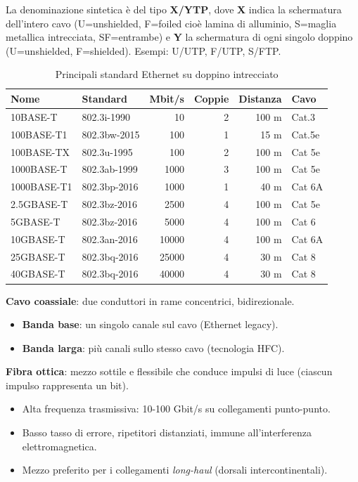 \documentclass[12pt, a4paper]{article}
\begin{document}
La denominazione sintetica è del tipo \textbf{X/YTP}, dove \textbf{X} indica la schermatura dell'intero cavo (U=unshielded, F=foiled cioè lamina di alluminio, S=maglia metallica intrecciata, SF=entrambe) e \textbf{Y} la schermatura di ogni singolo doppino (U=unshielded, F=shielded). Esempi: U/UTP, F/UTP, S/FTP.

\begin{table}[H]
\centering
\caption{Principali standard Ethernet su doppino intrecciato}
\begin{tabular}{llrrrl}
\toprule
\textbf{Nome} & \textbf{Standard} & \textbf{Mbit/s} & \textbf{Coppie} & \textbf{Distanza} & \textbf{Cavo} \\
\midrule
10BASE-T & 802.3i-1990 & 10 & 2 & 100 m & Cat.3 \\
100BASE-T1 & 802.3bw-2015 & 100 & 1 & 15 m & Cat.5e \\
100BASE-TX & 802.3u-1995 & 100 & 2 & 100 m & Cat 5e \\
1000BASE-T & 802.3ab-1999 & 1000 & 3 & 100 m & Cat 5e \\
1000BASE-T1 & 802.3bp-2016 & 1000 & 1 & 40 m & Cat 6A \\
2.5GBASE-T & 802.3bz-2016 & 2500 & 4 & 100 m & Cat 5e \\
5GBASE-T & 802.3bz-2016 & 5000 & 4 & 100 m & Cat 6 \\
10GBASE-T & 802.3an-2016 & 10000 & 4 & 100 m & Cat 6A \\
25GBASE-T & 802.3bq-2016 & 25000 & 4 & 30 m & Cat 8 \\
40GBASE-T & 802.3bq-2016 & 40000 & 4 & 30 m & Cat 8 \\
\bottomrule
\end{tabular}
\end{table}

\textbf{Cavo coassiale}: due conduttori in rame concentrici, bidirezionale.
\begin{itemize}
    \item \textbf{Banda base}: un singolo canale sul cavo (Ethernet legacy).
    \item \textbf{Banda larga}: più canali sullo stesso cavo (tecnologia HFC).
\end{itemize}

\textbf{Fibra ottica}: mezzo sottile e flessibile che conduce impulsi di luce (ciascun impulso rappresenta un bit).
\begin{itemize}
    \item Alta frequenza trasmissiva: 10-100 Gbit/s su collegamenti punto-punto.
    \item Basso tasso di errore, ripetitori distanziati, immune all'interferenza elettromagnetica.
    \item Mezzo preferito per i collegamenti \textit{long-haul} (dorsali intercontinentali).
\end{itemize}
\end{document}
